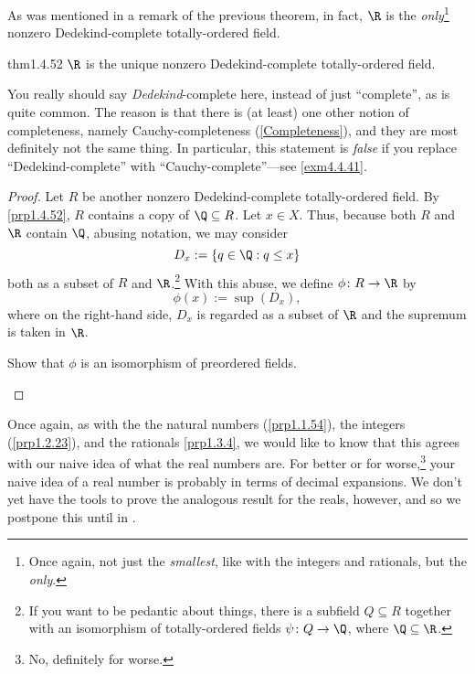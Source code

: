 As was mentioned in a remark of the previous theorem, in fact, $\R$ is the \emph{only}\footnote{Once again, not just the \emph{smallest}, like with the integers and rationals, but the \emph{only}.} nonzero Dedekind-complete totally-ordered field.
\begin{thm}{}{thm1.4.52}
$\R$ is the unique nonzero Dedekind-complete totally-ordered field.
\begin{rmk}
You really should say \emph{Dedekind}-complete here, instead of just ``complete'', as is quite common.  The reason is that there is (at least) one other notion of completeness, namely Cauchy-completeness (\cref{Completeness}), and they are most definitely not the same thing.  In particular, this statement is \emph{false} if you replace ``Dedekind-complete'' with ``Cauchy-complete''---see \cref{exm4.4.41}.
\end{rmk}
\begin{proof}
Let $R$ be another nonzero Dedekind-complete totally-ordered field.  By \cref{prp1.4.52}, $R$ contains a copy of $\Q \subseteq R$.  Let $x\in X$.  Thus, because both $R$ and $\R$ contain $\Q$, abusing notation, we may consider
\begin{equation}
D_x:=\left\{ q\in \Q :q\leq x\right\}
\end{equation}
both as a subset of $R$ and $\R$.\footnote{If you want to be pedantic about things, there is a subfield $Q\subseteq R$ together with an isomorphism of totally-ordered fields $\psi \colon Q\rightarrow \Q$, where $\Q \subseteq \R$.}  With this abuse, we define $\phi \colon R\rightarrow \R$ by
\begin{equation}
\phi (x):=\sup (D_x),
\end{equation}
where on the right-hand side, $D_x$ is regarded as a subset of $\R$ and the supremum is taken in $\R$.
\begin{exr}[breakable=false]{}{}
Show that $\phi$ is an isomorphism of preordered fields.
\end{exr}
\end{proof}
\end{thm}

Once again, as with the the natural numbers (\cref{prp1.1.54}), the integers (\cref{prp1.2.23}), and the rationals \cref{prp1.3.4}, we would like to know that this agrees with our naive idea of what the real numbers are.  For better or for worse,\footnote{No, definitely for worse.} your naive idea of a real number is probably in terms of decimal expansions.  We don't yet have the tools to prove the analogous result for the reals, however, and so we postpone this until  in .

